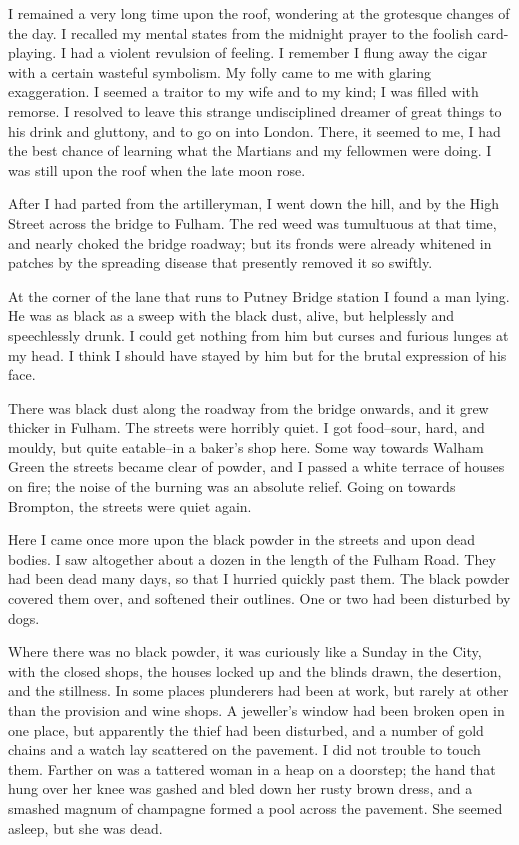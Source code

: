 I remained a very long time upon the roof, wondering at the
grotesque changes of the day. I recalled my mental states from the
midnight prayer to the foolish card-playing. I had a violent
revulsion of feeling. I remember I flung away the cigar with a
certain wasteful symbolism. My folly came to me with glaring
exaggeration. I seemed a traitor to my wife and to my kind; I was
filled with remorse. I resolved to leave this strange undisciplined
dreamer of great things to his drink and gluttony, and to go on
into London. There, it seemed to me, I had the best chance of
learning what the Martians and my fellowmen were doing. I was still
upon the roof when the late moon rose.

After I had parted from the artilleryman, I went down the hill, and
by the High Street across the bridge to Fulham. The red weed was
tumultuous at that time, and nearly choked the bridge roadway; but
its fronds were already whitened in patches by the spreading
disease that presently removed it so swiftly.

At the corner of the lane that runs to Putney Bridge station I
found a man lying. He was as black as a sweep with the black dust,
alive, but helplessly and speechlessly drunk. I could get nothing
from him but curses and furious lunges at my head. I think I should
have stayed by him but for the brutal expression of his face.

There was black dust along the roadway from the bridge onwards, and
it grew thicker in Fulham. The streets were horribly quiet. I got
food--sour, hard, and mouldy, but quite eatable--in a baker's shop
here. Some way towards Walham Green the streets became clear of
powder, and I passed a white terrace of houses on fire; the noise
of the burning was an absolute relief. Going on towards Brompton,
the streets were quiet again.

Here I came once more upon the black powder in the streets and upon
dead bodies. I saw altogether about a dozen in the length of the
Fulham Road. They had been dead many days, so that I hurried
quickly past them. The black powder covered them over, and softened
their outlines. One or two had been disturbed by dogs.

Where there was no black powder, it was curiously like a Sunday in
the City, with the closed shops, the houses locked up and the
blinds drawn, the desertion, and the stillness. In some places
plunderers had been at work, but rarely at other than the provision
and wine shops. A jeweller's window had been broken open in one
place, but apparently the thief had been disturbed, and a number of
gold chains and a watch lay scattered on the pavement. I did not
trouble to touch them. Farther on was a tattered woman in a heap on
a doorstep; the hand that hung over her knee was gashed and bled
down her rusty brown dress, and a smashed magnum of champagne
formed a pool across the pavement. She seemed asleep, but she was
dead.

